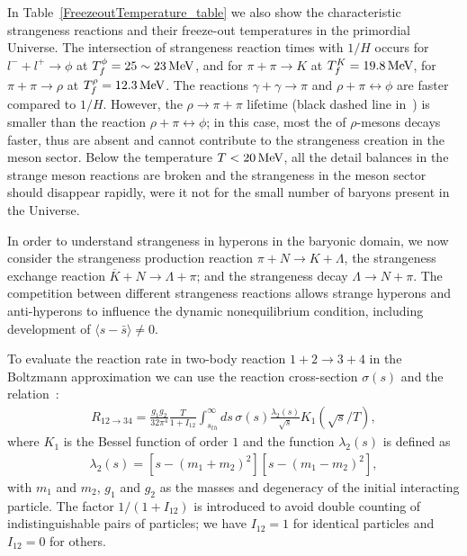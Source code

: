 In Table~\ref{FreezeoutTemperature_table} we also show the characteristic strangeness reactions and their freeze-out temperatures in the primordial Universe. The intersection of strangeness reaction times with $1/H$ occurs for $l^-+l^+\rightarrow\phi$ at $T_f^\phi=25\sim23\text{\,MeV}$, and for $\pi+\pi\rightarrow K$ at $T_f^K=19.8\text{\,MeV}$, for $\pi+\pi\rightarrow\rho$ at $T_f^\rho=12.3\text{\,MeV}$. The reactions $\gamma+\gamma\rightarrow\pi$ and $\rho+\pi\leftrightarrow\phi$ are faster compared to $1/H$. However, the $\rho\to\pi+\pi$ lifetime (black dashed line in~) is smaller than the reaction $\rho+\pi\leftrightarrow\phi$; in this case, most the of $\rho$-mesons decays faster, thus are absent and cannot contribute to the strangeness creation in the meson sector. Below the temperature $T<20\text{\,MeV}$, all the detail balances in the strange meson reactions are broken and the strangeness in the meson sector should disappear rapidly, were it not for the small number of baryons present in the Universe.

In order to understand strangeness in hyperons in the baryonic domain, we now consider the strangeness production reaction $\pi +N\rightarrow K+\Lambda$, the strangeness exchange reaction $\overline{K}+N\rightarrow \Lambda+\pi$; and the strangeness decay $\Lambda\rightarrow N+\pi$. The competition between different strangeness reactions allows strange hyperons and anti-hyperons to influence the dynamic nonequilibrium condition, including development of $\langle s-\bar s\rangle \ne 0$.

To evaluate the reaction rate in two-body reaction $1+2\rightarrow3+4$ in the Boltzmann approximation we can use the reaction cross-section $\sigma(s)$ and the relation~\cite{Letessier:2002ony}:
\begin{align}
R_{12\rightarrow34}=\frac{g_1g_2}{32\pi^4}\frac{T}{1+I_{12}}\!\!\int^\infty_{s_{th}}\!\!\!\!ds\,\sigma(s)\frac{\lambda_2(s)}{\sqrt{s}}\!K_1\!\!\left({\sqrt{s}}/{T}\right),
\end{align}
where $K_1$ is the Bessel function of order $1$ and the function $\lambda_2(s)$ is defined as
\begin{align}
\lambda_2(s)=\left[s-(m_1+m_2)^2\right]\left[s-(m_1-m_2)^2\right],
\end{align}
with $m_1$ and $m_2$, $g_1$ and $g_2$ as the masses and degeneracy of the initial interacting particle. The factor $1/(1+I_{12})$ is introduced to avoid double counting of indistinguishable pairs of particles; we have $I_{12}=1$ for identical particles and $I_{12}=0$ for others. 

